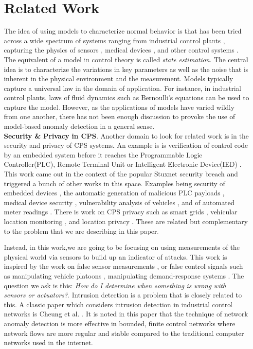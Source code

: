 \section{Related Work}
The idea of using models to characterize normal behavior is that has been tried across a wide spectrum of systems ranging from industrial control plants \cite{}, capturing the physics of sensors \cite{}, medical devices \cite{}, and other control systems \cite{}. The equivalent of a model in control theory is called \textit{state estimation}. The central idea is to characterize the variations in key parameters as well as the noise that is inherent in the physical environment and the measurement. Models typically capture a universal law in the domain of application. For instance, in industrial control plants, laws of fluid dynamics such as Bernoulli's equations can be used to capture the model. However, as the applications of models have varied wildly from one another, there has not been enough discussion to provoke the use of model-based anomaly detection in a general sense. \\

\textbf{Security \& Privacy in CPS}. Another domain to look for related work is in the security and privacy of CPS systems. An example is is verification of control code by an embedded system before it reaches the Programmable Logic Controller(PLC), Remote Terminal Unit or Intelligent Electronic Device(IED) \cite{}. This work came out in the context of the popular Stuxnet \cite{} security breach and triggered a bunch of other works in this space. Examples being security of embedded devices \cite{}, the automatic generation of malicious PLC payloads \cite{}, medical device security \cite{}, vulnerability analysis of vehicles \cite{}, and of automated meter readings \cite{}. There is work on CPS privacy such as smart grids \cite{}, vehicular location monitoring \cite{}, and location privacy \cite{}. These are related but complementary to the problem that we are describing in this paper. 

Instead, in this work,we are going to be focusing on using measurements of the physical world via sensors to build up an indicator of attacks. This work is inspired by the work on false sensor measurements \cite{}, or false control signals such as manipulating vehicle platoons \cite{}, manipulating demand-response systems \cite{}. The question we ask is this: \textit{How do I determine when something is wrong with sensors or actuators?}. Intrusion detection is a problem that is closely related to this. A classic paper which considers intrusion detection in industrial control networks is Cheung et al. \cite{}. It is noted in this paper that the technique of network anomaly detection is more effective in bounded, finite control networks where network flows are more regular and stable compared to the traditional computer networks used in the internet.

